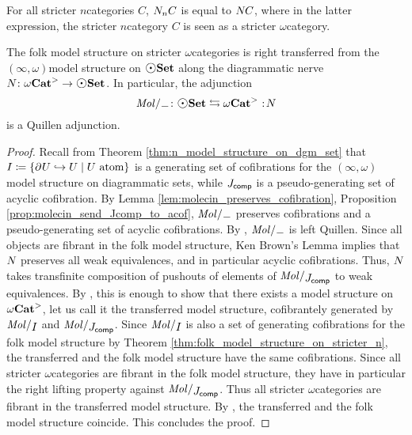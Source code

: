 \begin{rmk}
    For all stricter \( n \)\nbd categories \( C \), \( N_{n} C \) is equal to \( N_{} C \), where in the latter expression, the stricter \( n \)\nbd category \( C \) is seen as a stricter \( \omega \)\nbd category.
\end{rmk}


\begin{prop} \label{prop:quillen_folk_dgm_infty}
    The folk model structure on stricter \( \omega \)\nbd categories is right transferred from the \( (\infty, \omega) \)\nbd model structure on \( \dgmSet \) along the diagrammatic nerve \( \N{} \colon \somegaCat \to \dgmSet \).
    In particular, the adjunction 
    \begin{equation*}
        \molecin{-} \colon \dgmSet \leftrightarrows \somegaCat \cocolon \N{}
    \end{equation*}
    is a Quillen adjunction.
\end{prop}
\begin{proof}
    Recall from Theorem \ref{thm:n_model_structure_on_dgm_set} that \( I \coloneqq \left\{ {\partial_{}^{} U \hookrightarrow U \mid U \text{ atom}} \right\} \) is a generating set of cofibrations for the \( (\infty, \omega) \)\nbd model structure on diagrammatic sets, while \( J_{\mathsf{comp}} \) is a pseudo-generating set of acyclic cofibration. 
    By Lemma \ref{lem:molecin_preserves_cofibration}, Proposition \ref{prop:molecin_send_Jcomp_to_acof}, \( \molecin{-} \) preserves cofibrations and a pseudo-generating set of acyclic cofibrations.
    By \cite[E.2.14]{joyal2008theory}, \( \molecin{-} \) is left Quillen. 
    Since all objects are fibrant in the folk model structure, Ken Brown's Lemma implies that \( N_{} \) preserves all weak equivalences, and in particular acyclic cofibrations. 
    Thus, \( N_{} \) takes transfinite composition of pushouts of elements of \( \molecin{\Jcomp} \) to weak equivalences.
    By \cite[Theorem 11.3.2]{hirschhorn2003model}, this is enough to show that there exists a model structure on \( {\omega\mathbf{Cat}}^> \), let us call it the transferred model structure, cofibrantely generated by \( \molecin{I} \) and \( \molecin{\Jcomp} \).
    Since \( \molecin{I} \) is also a set of generating cofibrations for the folk model structure by Theorem \ref{thm:folk_model_structure_on_stricter_n}, the transferred and the folk model structure have the same cofibrations.
    Since all stricter \( \omega \)\nbd categories are fibrant in the folk model structure, they have in particular the right lifting property against \( \molecin{\Jcomp} \).
    Thus all stricter \( \omega \)\nbd categories are fibrant in the transferred model structure.
    By \cite[Proposition E.1.10]{joyal2008theory}, the transferred and the folk model structure coincide.
    This concludes the proof.
\end{proof}


